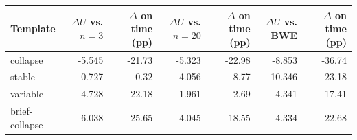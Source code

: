 \begin{tabular}{lrrrrrr}
\toprule
Template & $\Delta U$ vs. $n=3$ & $\Delta$ on time (pp) & $\Delta U$ vs. $n=20$ & $\Delta$ on time (pp) & $\Delta U$ vs. BWE & $\Delta$ on time (pp)\\
\midrule
collapse & -5.545 & -21.73 & -5.323 & -22.98 & -8.853 & -36.74\\
stable & -0.727 & -0.32 & 4.056 & 8.77 & 10.346 & 23.18\\
variable & 4.728 & 22.18 & -1.961 & -2.69 & -4.341 & -17.41\\
brief-collapse & -6.038 & -25.65 & -4.045 & -18.55 & -4.334 & -22.68\\
\bottomrule
\end{tabular}
